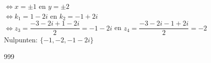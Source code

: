 \documentclass[a4paper]{article}
\begin{document}
$ \Leftrightarrow x = \pm 1 $ en $ y = \pm 2 $ \\

$ \Leftrightarrow k_1 = 1 - 2i $ en $ k_2 = -1 + 2i $ \\

$ \Leftrightarrow z_3 = \dfrac{-3 -2i + 1 -2i}{2} = -1 - 2i $ en $ z_4 = \dfrac{-3-2i -1+2i}{2} = -2 $ \\

Nulpunten: $ \{-1, -2, -1 - 2i\} $ \\

\begin{thebibliography}{999}
\end{thebibliography}
\end{document}
